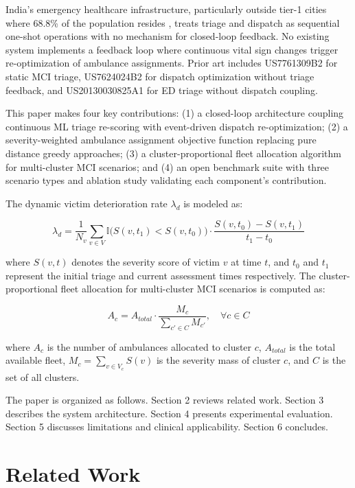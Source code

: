 \documentclass[conference]{IEEEtran}
\begin{document}
India's emergency healthcare infrastructure, particularly outside tier-1 cities where 68.8\% of the population resides \cite{census2011}, treats triage and dispatch as sequential one-shot operations with no mechanism for closed-loop feedback. No existing system implements a feedback loop where continuous vital sign changes trigger re-optimization of ambulance assignments. Prior art includes US7761309B2 for static MCI triage, US7624024B2 for dispatch optimization without triage feedback, and US20130030825A1 for ED triage without dispatch coupling.

This paper makes four key contributions: (1) a closed-loop architecture coupling continuous ML triage re-scoring with event-driven dispatch re-optimization; (2) a severity-weighted ambulance assignment objective function replacing pure distance greedy approaches; (3) a cluster-proportional fleet allocation algorithm for multi-cluster MCI scenarios; and (4) an open benchmark suite with three scenario types and ablation study validating each component's contribution.

The dynamic victim deterioration rate $\lambda_d$ is modeled as:

\begin{equation}
\lambda_d = \frac{1}{N_v} \sum_{v \in V} 
\mathbb{I}\bigl( S(v, t_1) < S(v, t_0) \bigr) 
\cdot \frac{S(v, t_0) - S(v, t_1)}{t_1 - t_0}
\end{equation}

where $S(v, t)$ denotes the severity score of victim $v$ at time $t$, and $t_0$ and $t_1$ represent the initial triage and current assessment times respectively. The cluster-proportional fleet allocation for multi-cluster MCI scenarios is computed as:

\begin{equation}
A_c = A_{total} \cdot \frac{M_c}{\sum_{c' \in C} M_{c'}}, \quad \forall c \in C
\end{equation}

where $A_c$ is the number of ambulances allocated to cluster $c$, $A_{total}$ is the total available fleet, $M_c = \sum_{v \in V_c} S(v)$ is the severity mass of cluster $c$, and $C$ is the set of all clusters.

The paper is organized as follows. Section 2 reviews related work. Section 3 describes the system architecture. Section 4 presents experimental evaluation. Section 5 discusses limitations and clinical applicability. Section 6 concludes.

\section{Related Work}
\end{document}
